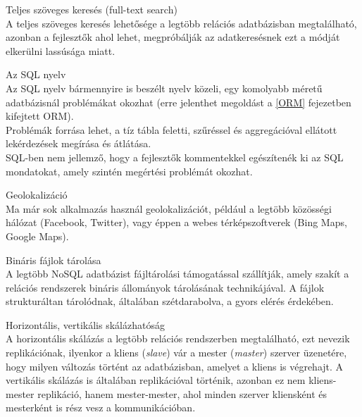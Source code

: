 \begin{description}
	\item{Teljes szöveges keresés (full-text search)} \hfill \\
		A teljes szöveges keresés lehetősége a legtöbb relációs adatbázisban megtalálható, azonban a fejlesztők ahol lehet, megpróbálják az adatkeresésnek ezt a módját elkerülni lassúsága miatt.
	\item{Az SQL nyelv} \hfill \\
		Az SQL nyelv bármennyire is beszélt nyelv közeli, egy komolyabb méretű adatbázisnál problémákat okozhat (erre jelenthet megoldást a \ref{ORM} fejezetben kifejtett ORM).\\
		Problémák forrása lehet, a tíz tábla feletti, szűréssel és aggregációval ellátott lekérdezések megírása és átlátása.\\
		SQL-ben nem jellemző, hogy a fejlesztők kommentekkel egészítenék ki az SQL mondatokat, amely szintén megértési problémát okozhat.
	\item{Geolokalizáció} \hfill \\
		Ma már sok alkalmazás használ geolokalizációt, például a legtöbb közösségi hálózat (Facebook, Twitter), vagy éppen a webes térképszoftverek (Bing Maps, Google Maps).
	\item{Bináris fájlok tárolása} \hfill \\
		A legtöbb NoSQL adatbázist fájltárolási támogatással szállítják, amely szakít a relációs rendszerek bináris állományok tárolásának technikájával. A fájlok strukturáltan tárolódnak, általában szétdarabolva, a gyors elérés érdekében.
	\item{Horizontális, vertikális skálázhatóság} \hfill \\
		A horizontális skálázás a legtöbb relációs rendszerben megtalálható, ezt nevezik replikációnak, ilyenkor a kliens (\emph{slave}) vár a mester (\emph{master}) szerver üzenetére, hogy milyen változás történt az adatbázisban, amelyet a kliens is végrehajt.
		A vertikális skálázás is általában replikációval történik, azonban ez nem kliens-mester replikáció, hanem mester-mester, ahol minden szerver kliensként és mesterként is rész vesz a kommunikációban.
\end{description}

